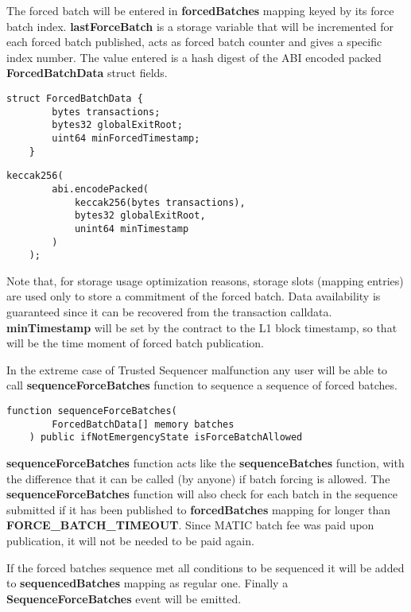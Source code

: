 The forced batch will be entered in \textbf{forcedBatches} mapping keyed by its force batch index. \textbf{lastForceBatch} is a storage variable that will be incremented for each forced batch published, acts as forced batch counter and gives a specific index number. The value entered is a hash digest of the ABI encoded packed \textbf{ForcedBatchData} struct fields.


\begin{lstlisting}[language=solidity]
	struct ForcedBatchData {
		bytes transactions;
		bytes32 globalExitRoot;
		uint64 minForcedTimestamp;
	}	
\end{lstlisting}

\begin{lstlisting}[language=Solidity]
	keccak256(
		abi.encodePacked(
			keccak256(bytes transactions),
			bytes32 globalExitRoot,
			unint64 minTimestamp
		)
	);
\end{lstlisting}

Note that, for storage usage optimization reasons, storage slots (mapping entries) are used only to store a commitment of the forced batch. Data availability is guaranteed since it can be recovered from the transaction calldata. \textbf{minTimestamp} will be set by the contract to the L1 block timestamp, so that will be the time moment of forced batch publication.

In the extreme case of Trusted Sequencer malfunction any user will be able to call \textbf{sequenceForceBatches} function to sequence a sequence of forced batches.

\begin{lstlisting}[language=Solidity]
	function sequenceForceBatches(
		ForcedBatchData[] memory batches
	) public ifNotEmergencyState isForceBatchAllowed
\end{lstlisting}

\textbf{sequenceForceBatches} function acts like the \textbf{sequenceBatches} function, with the difference that it can be called (by anyone) if batch forcing is allowed. The \textbf{sequenceForceBatches} function will also check for each batch in the sequence submitted if it has been published to \textbf{forcedBatches} mapping for longer than \textbf{FORCE\_BATCH\_TIMEOUT}. Since MATIC batch fee was paid upon publication, it will not be needed to be paid again.

If the forced batches sequence met all conditions to be sequenced it will be added to \textbf{sequencedBatches} mapping as regular one. Finally a \textbf{SequenceForceBatches} event will be emitted.

